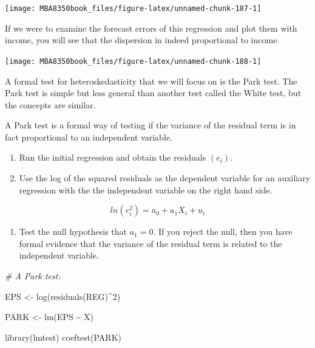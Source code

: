 \documentclass[
]{book}
\newenvironment{Shaded}{\begin{snugshade}}{\end{snugshade}}
\newcommand{\CommentTok}[1]{\textcolor[rgb]{0.56,0.35,0.01}{\textit{#1}}}
\newcommand{\DecValTok}[1]{\textcolor[rgb]{0.00,0.00,0.81}{#1}}
\newcommand{\FunctionTok}[1]{\textcolor[rgb]{0.00,0.00,0.00}{#1}}
\newcommand{\NormalTok}[1]{#1}
\newcommand{\OtherTok}[1]{\textcolor[rgb]{0.56,0.35,0.01}{#1}}
\newcommand{\SpecialCharTok}[1]{\textcolor[rgb]{0.00,0.00,0.00}{#1}}
\providecommand{\tightlist}{%
  \setlength{\itemsep}{0pt}\setlength{\parskip}{0pt}}
\begin{document}
\begin{center}\texttt{[image: MBA8350book\_files/figure-latex/unnamed-chunk-187-1]} \end{center}

If we were to examine the forecast errors of this regression and plot them with income, you will see that the dispersion in indeed proportional to income.

\begin{center}\texttt{[image: MBA8350book\_files/figure-latex/unnamed-chunk-188-1]} \end{center}

A formal test for heteroskedasticity that we will focus on is the Park test. The Park test is simple but less general than another test called the White test, but the concepts are similar.

A Park test is a formal way of testing if the variance of the residual term is in fact proportional to an independent variable.

\begin{enumerate}
\def\labelenumi{\arabic{enumi}.}
\item
  Run the initial regression and obtain the residuals \((e_i)\).
\item
  Use the log of the squared residuals as the dependent variable for an auxiliary regression with the the independent variable on the right hand side.
\end{enumerate}

\[ ln( e_i^2) = a_0 + a_1 X_i + u_i\]

\begin{enumerate}
\def\labelenumi{\arabic{enumi}.}
\setcounter{enumi}{2}
\tightlist
\item
  Test the null hypothesis that \(a_1 = 0\). If you reject the null, then you have formal evidence that the variance of the residual term is related to the independent variable.
\end{enumerate}

\begin{Shaded}
\begin{Highlighting}[]
\CommentTok{\# A Park test:}

\NormalTok{EPS }\OtherTok{\textless{}{-}} \FunctionTok{log}\NormalTok{(}\FunctionTok{residuals}\NormalTok{(REG)}\SpecialCharTok{\^{}}\DecValTok{2}\NormalTok{)}

\NormalTok{PARK }\OtherTok{\textless{}{-}} \FunctionTok{lm}\NormalTok{(EPS }\SpecialCharTok{\textasciitilde{}}\NormalTok{ X)}

\FunctionTok{library}\NormalTok{(lmtest)}
\FunctionTok{coeftest}\NormalTok{(PARK)}
\end{Highlighting}
\end{Shaded}
\end{document}
